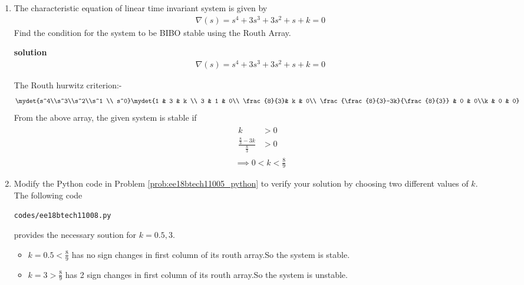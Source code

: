 \begin{enumerate}[label=\thesubsection.\arabic*.,ref=\thesubsection.\theenumi]
\item 
The characteristic equation of linear time invariant system is given by
\begin{align} 
\nabla(s)=s^4+3s^3+3s^2+s+k=0
\end{align}
Find the condition for the system to be BIBO stable using the Routh Array.

\textbf{solution}
\begin{align}
\nabla(s)=s^4+3s^3+3s^2+s+k=0
\end{align}

The Routh hurwitz criterion:-
\bigskip
\begin{align}
\mydet{s^4\\s^3\\s^2\\s^1 \\ s^0}
\mydet{1 & 3 & k \\ 3 & 1 & 0\\  \frac{8}{3}& k & 0\\ \frac{\frac{8}{3}-3k}{\frac{8}{3}} & 0 & 0\\k & 0 & 0} 
\end{align}
From the above array, the given system is stable if
\begin{align}
\begin{split}
k&>0 
\\
  \frac{\frac{8}{3}-3k}{\frac{8}{3}}&>0    
\end{split}
\\
\implies 0<k<\frac{8}{9}
\end{align}
%
\item Modify the Python code in Problem \ref{prob:ee18btech11005_python} to verify your solution by choosing two different values of $k$.
\label{prob:ee18btech11008_python}
\\
\solution 
The following code 
%
\begin{lstlisting}
codes/ee18btech11008.py
\end{lstlisting}
%
provides the necessary soution for $k = 0.5, 3$.
\begin{itemize}
  \item $k=0.5 < \frac{8}{9}$ has no sign changes in first column of its routh array.So the system is stable.
  \item $k=3 > \frac{8}{9}$ has 2 sign changes in first column of its routh array.So the system is unstable.
  \end{itemize}

\end{enumerate}
